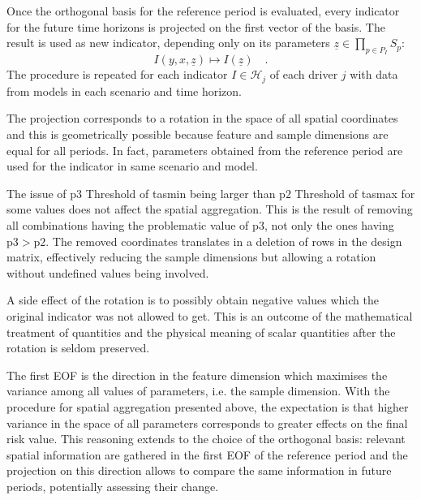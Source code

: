 Once the orthogonal basis for the reference period is evaluated, every indicator for the future time horizons is projected on the first vector of the basis. The result is used as new indicator, depending only on its parameters $\underline{z} \in \prod_{p \in P_I} S_p$:
\begin{equation}
  \label{eq:spatial_aggregation}
  I(y, x, \underline{z}) \mapsto I(\underline{z})%
  \quad .
\end{equation}
The procedure is repeated for each indicator $I \in \mathcal{H}_j$ of each \gls{driver} $j$ with data from models in each scenario and time horizon.

The projection corresponds to a rotation in the space of all spatial coordinates and this is geometrically possible because feature and sample dimensions are equal for all periods. In fact, parameters obtained from the reference period are used for the indicator in same scenario and model.

The issue of $\mathrm{p3}$ {Threshold of \gls{tasmin}} being larger than $\mathrm{p2}$ {Threshold of \gls{tasmax}} for some values does not affect the spatial aggregation. This is the result of removing all combinations having the problematic value of $\mathrm{p3}$, not only the ones having $\mathrm{p3} > \mathrm{p2}$. The removed coordinates translates in a deletion of rows in the design matrix, effectively reducing the sample dimensions but allowing a rotation without undefined values being involved.

A side effect of the rotation is to possibly obtain negative values which the original indicator was not allowed to get. This is an outcome of the mathematical treatment of quantities and the physical meaning of scalar quantities after the rotation is seldom preserved.

The first \gls{EOF} is the direction in the feature dimension which maximises the variance among all values of parameters, i.e. the sample dimension. With the procedure for spatial aggregation presented above, the expectation is that higher variance in the space of all parameters corresponds to greater effects on the final \gls{risk} value. This reasoning extends to the choice of the orthogonal basis: relevant spatial information are gathered in the first \gls{EOF} of the reference period and the projection on this direction allows to compare the same information in future periods, potentially assessing their change.

